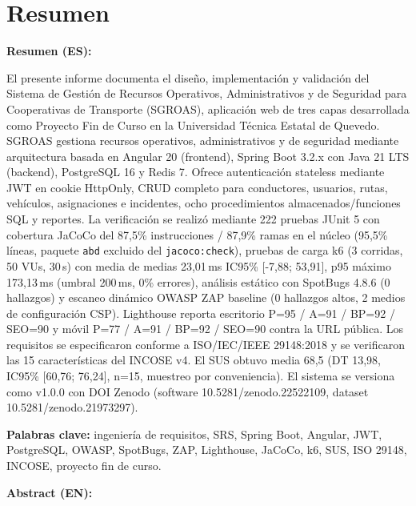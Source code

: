 \chapter*{Resumen}

\textbf{Resumen (ES):}

El presente informe documenta el diseño, implementación y validación del Sistema de Gestión de Recursos Operativos, Administrativos y de Seguridad para Cooperativas de Transporte (SGROAS), aplicación web de tres capas desarrollada como Proyecto Fin de Curso en la Universidad Técnica Estatal de Quevedo. SGROAS gestiona recursos operativos, administrativos y de seguridad mediante arquitectura basada en Angular 20 (frontend), Spring Boot 3.2.x con Java 21 LTS (backend), PostgreSQL 16 y Redis 7. Ofrece autenticación stateless mediante JWT en cookie HttpOnly, CRUD completo para conductores, usuarios, rutas, vehículos, asignaciones e incidentes, ocho procedimientos almacenados/funciones SQL y reportes. La verificación se realizó mediante 222 pruebas JUnit 5 con cobertura JaCoCo del 87,5\% instrucciones / 87,9\% ramas en el núcleo (95,5\% líneas, paquete \texttt{abd} excluido del \texttt{jacoco:check}), pruebas de carga k6 (3 corridas, 50 VUs, 30\,s) con media de medias 23,01\,ms IC95\% [-7,88; 53,91], p95 máximo 173,13\,ms (umbral 200\,ms, 0\% errores), análisis estático con SpotBugs 4.8.6 (0 hallazgos) y escaneo dinámico OWASP ZAP baseline (0 hallazgos altos, 2 medios de configuración CSP). Lighthouse reporta escritorio P=95 / A=91 / BP=92 / SEO=90 y móvil P=77 / A=91 / BP=92 / SEO=90 contra la URL pública. Los requisitos se especificaron conforme a ISO/IEC/IEEE 29148:2018 y se verificaron las 15 características del INCOSE v4. El SUS obtuvo media 68,5 (DT 13,98, IC95\% [60,76; 76,24], n=15, muestreo por conveniencia). El sistema se versiona como v1.0.0 con DOI Zenodo (software 10.5281/zenodo.22522109, dataset 10.5281/zenodo.21973297).

\textbf{Palabras clave:} ingeniería de requisitos, SRS, Spring Boot, Angular, JWT, PostgreSQL, OWASP, SpotBugs, ZAP, Lighthouse, JaCoCo, k6, SUS, ISO 29148, INCOSE, proyecto fin de curso.

\medskip

\textbf{Abstract (EN):}

